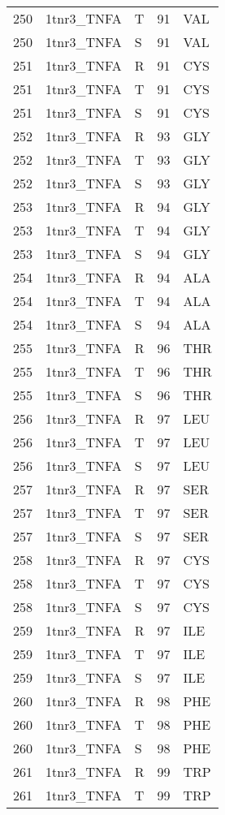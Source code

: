\begin{tiny}
\begin{longtable}[l]{l|l|l|l|l}
	250 & 1tnr3\_TNFA & T & 91 & VAL \\
	250 & 1tnr3\_TNFA & S & 91 & VAL \\
	251 & 1tnr3\_TNFA & R & 91 & CYS \\
	251 & 1tnr3\_TNFA & T & 91 & CYS \\
	251 & 1tnr3\_TNFA & S & 91 & CYS \\
	252 & 1tnr3\_TNFA & R & 93 & GLY \\
	252 & 1tnr3\_TNFA & T & 93 & GLY \\
	252 & 1tnr3\_TNFA & S & 93 & GLY \\
	253 & 1tnr3\_TNFA & R & 94 & GLY \\
	253 & 1tnr3\_TNFA & T & 94 & GLY \\
	253 & 1tnr3\_TNFA & S & 94 & GLY \\
	254 & 1tnr3\_TNFA & R & 94 & ALA \\
	254 & 1tnr3\_TNFA & T & 94 & ALA \\
	254 & 1tnr3\_TNFA & S & 94 & ALA \\
	255 & 1tnr3\_TNFA & R & 96 & THR \\
	255 & 1tnr3\_TNFA & T & 96 & THR \\
	255 & 1tnr3\_TNFA & S & 96 & THR \\
	256 & 1tnr3\_TNFA & R & 97 & LEU \\
	256 & 1tnr3\_TNFA & T & 97 & LEU \\
	256 & 1tnr3\_TNFA & S & 97 & LEU \\
	257 & 1tnr3\_TNFA & R & 97 & SER \\
	257 & 1tnr3\_TNFA & T & 97 & SER \\
	257 & 1tnr3\_TNFA & S & 97 & SER \\
	258 & 1tnr3\_TNFA & R & 97 & CYS \\
	258 & 1tnr3\_TNFA & T & 97 & CYS \\
	258 & 1tnr3\_TNFA & S & 97 & CYS \\
	259 & 1tnr3\_TNFA & R & 97 & ILE \\
	259 & 1tnr3\_TNFA & T & 97 & ILE \\
	259 & 1tnr3\_TNFA & S & 97 & ILE \\
	260 & 1tnr3\_TNFA & R & 98 & PHE \\
	260 & 1tnr3\_TNFA & T & 98 & PHE \\
	260 & 1tnr3\_TNFA & S & 98 & PHE \\
	261 & 1tnr3\_TNFA & R & 99 & TRP \\
	261 & 1tnr3\_TNFA & T & 99 & TRP \\

\end{longtable}
\end{tiny}
